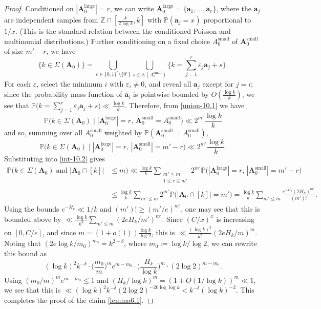 \documentclass[11pt,reqno]{amsart}
\numberwithin{equation}{section}
\theoremstyle{definition}
\theoremstyle{remark}
\newcommand{\mb}{\mathbb}
\newcommand{\mbf}{\mathbf}
\newcommand{\eps}{\varepsilon}
\renewcommand{\le}{\leqslant}
\renewcommand{\ge}{\geqslant}
\newcommand\Z{\mathbb{Z}}
\def\sml{\operatorname{small}}
\def\lrg{\operatorname{large}}
\begin{document}
\begin{proof}
Conditioned on $|\mbf{A}_0^{\lrg}| = r$, we can write $\mbf{A}_0^{\lrg} = \{ \mbf{a}_1,\dots, \mbf{a}_r\}$, where the $\mbf{a}_j$ are independent samples from $\Z \cap [\frac{k}{2\log k}, k]$ with $\mb{P}(\mbf{a}_j = x)$ proportional to $1/x$. (This is the standard relation between the conditioned Poisson and multinomial distributions.) Further conditioning on a fixed choice $A_0^{\sml}$ of $\mbf{A}_0^{\sml}$ of size $m' -r$, we have 
\begin{equation}\label{union-10.1} \{ k \in \Sigma(\mbf{A}_0) \} = \bigcup_{\eps \in \{0,1\}^r \setminus \{0^r\}} \bigcup_{s \in \Sigma(A_0^{\sml})} \{ k = \sum_{j = 1}^r \eps_j \mbf{a}_j + s\}.\end{equation}
For each $\eps$, select the minimum $i$ with $\eps_i \ne 0$, and reveal all $\mbf{a}_j$ except for $j = i$; since the probability mass function of $\mbf{a}_i$ is pointwise bounded by $O(\frac{\log k}{k})$, we see that $\mb{P} \big(k = \sum_{j = 1}^r \eps_j \mbf{a}_j + s\big) \ll \frac{\log k}{k}$. Therefore, from \cref{union-10.1} we have
\[ \mb{P}\big(k \in \Sigma(\mbf{A}_0) \mid |\mbf{A}_0^{\lrg}| = r, \, \mbf{A}_0^{\sml} = A^{\sml}_0 \big) \ll 2^{m'} \frac{\log k}{k}\] and so, summing over all $A^{\sml}_0$ weighted by $\mb{P}(\mbf{A}_0^{\sml} = A^{\sml}_0)$,
\[ \mb{P}\big(k \in \Sigma(\mbf{A}_0) \mid |\mbf{A}_0^{\lrg}| = r, \,|\mbf{A}_0^{\sml}| = m' - r\big) \ll 2^{m'} \frac{\log k}{k}.\] Substituting into \cref{int-10.2} gives
\begin{align*}
\mb{P}\big(k \in \Sigma(\mbf{A}_0) \; \mbox{and} \; |\mbf{A}_0 \cap [k]| & \le  m \big)  \ll \frac{\log k}{k}\sum_{\substack{m' \le m \\ 1 \le r \le m'}} 2^{m'} \mb{P} \big(|\mbf{A}_0^{\lrg}| = r, \, |\mbf{A}_0^{\sml}| = m' - r \big)  \\ & \le \frac{\log k}{k} \sum_{m' \le m} 2^{m'} \mb{P} \big(|\mbf{A}_0 \cap [k] | = m'\big) = \frac{\log k}{k} \sum_{m' \le m}  \frac{e^{-H_k}(2H_k)^{m'} }{(m')!}.
\end{align*}
Using the bounds $e^{-H_k} \ll 1/k$ and $(m')! \ge (m'/e)^{m'}$, one may see that this is bounded above by $\ll \frac{\log k}{k^2} \sum_{m' \le m} (2e H_k/m')^{m'}$. Since $(C/x)^x$ is increasing on $[0, C/e]$, and since $m =  (1 + o(1)) \frac{\log k}{\log 2}$, this is $\ll \frac{(\log k)^2}{k^2} (2e H_k/m)^m$. Noting that $(2e \log k/m_0)^{m_0} = k^{2 - \delta}$, where $m_0 := \log k/\log 2$, we can rewrite this bound as 
\[ (\log k)^2 k^{-\delta} \cdot \big( \frac{m_0}{m}\big)^m e^{m - m_0} \cdot \big( \frac{H_k}{\log k}\big)^m \cdot (2 \log 2)^{m - m_0}.\] Using $(m_0/m)^m e^{m - m_0} \le 1$ and $(H_k/\log k)^m = (1 + O(1/\log k))^m \ll 1$, we see that this is $\ll (\log k)^2k^{-\delta} (2 \log 2)^{-20 \log \log k} < k^{-\delta}( \log k)^{-2}$. This completes the proof of the claim \cref{lemma6.1}. 


\end{proof}
\end{document}
